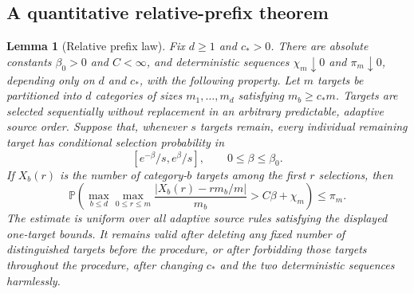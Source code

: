 \documentclass[11pt]{article}
\newtheorem{lemma}[theorem]{Lemma}
\theoremstyle{remark}
\newcommand{\Pp}{\mathbb P}
\begin{document}
\subsection{A quantitative relative-prefix theorem}

\begin{lemma}[Relative prefix law]
\label{lem:pd-relative-prefix}
Fix $d\ge1$ and $c_*>0$.  There are absolute constants
$\beta_0>0$ and $C<\infty$, and deterministic sequences
$\chi_m\downarrow0$ and $\pi_m\downarrow0$, depending only on $d$ and $c_*$,
with the following property.  Let $m$ targets be
partitioned into $d$ categories of sizes $m_1,\ldots,m_d$ satisfying
$m_b\ge c_*m$.  Targets are selected sequentially without replacement in an
arbitrary predictable, adaptive source order.  Suppose that, whenever $s$
targets remain, every individual remaining target has conditional selection
probability in
\[
        [e^{-\beta}/s,e^\beta/s],
        \qquad 0\le\beta\le\beta_0.
\]
If $X_b(r)$ is the number of category-$b$ targets among the first $r$
selections, then
\[
 \Pp\left(
 \max_{b\le d}\max_{0\le r\le m}
 \frac{|X_b(r)-rm_b/m|}{m_b}>C\beta+\chi_m
 \right)\le\pi_m.
 \tag{6.5}\label{eq:pd-relative-prefix}
\]
The estimate is uniform over all adaptive source rules satisfying the displayed
one-target bounds.  It remains valid after deleting any fixed number of
distinguished targets before the procedure, or after forbidding those targets
throughout the procedure, after changing $c_*$ and the two deterministic
sequences harmlessly.
\end{lemma}
\end{document}
